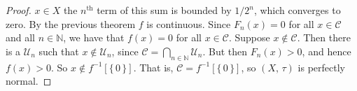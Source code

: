 \documentclass{article}
\theoremstyle{plain}
\theoremstyle{normal}
\begin{document}
\begin{proof}
            $x\in{X}$ the $n^{\textrm{th}}$ term of this sum is bounded by
            $1/2^{n}$, which converges to zero. By the previous theorem
            $f$ is continuous. Since $F_{n}(x)=0$ for all
            $x\in\mathcal{C}$ and all $n\in\mathbb{N}$, we have that
            $f(x)=0$ for all $x\in\mathcal{C}$. Suppose $x\notin\mathcal{C}$.
            Then there is a $\mathcal{U}_{n}$ such that
            $x\notin\mathcal{U}_{n}$, since
            $\mathcal{C}=\bigcap_{n\in\mathbb{N}}\mathcal{U}_{n}$. But then
            $F_{n}(x)>0$, and hence $f(x)>0$. So
            $x\notin{f}^{-1}[\{\,0\,\}]$. That is,
            $\mathcal{C}=f^{-1}[\{\,0\,\}]$, so $(X,\,\tau)$ is perfectly normal.
        \end{proof}
\end{document}
